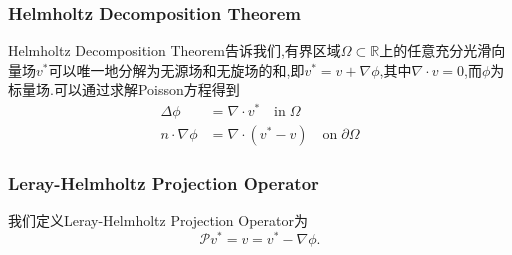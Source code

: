 \documentclass[12pt,halfline,a4paper]{ouparticle}
\begin{document}
\subsubsection{Helmholtz Decomposition Theorem}
Helmholtz Decomposition Theorem告诉我们,有界区域$\Omega\subset\mathbb{R}$上的任意充分光滑向量场$v^*$可以唯一地分解为无源场和无旋场的和,即$v^* = v + \nabla \phi$,其中$\nabla \cdot v = 0$,而$\phi$为标量场.可以通过求解Poisson方程得到
\begin{equation}
    \begin{aligned}
        \Delta \phi &= \nabla \cdot v^* \quad \text{in} \; \Omega\\
        n \cdot \nabla \phi &= \nabla \cdot (v^*-v) \quad \text{on} \; \partial \Omega
    \end{aligned}
\end{equation}
\subsubsection{Leray-Helmholtz Projection Operator}
我们定义Leray-Helmholtz Projection Operator为
\begin{equation}\label{eq:Leray_Projection}
    \mathscr{P}v^* = v = v^* - \nabla \phi .
\end{equation}
\end{document}
